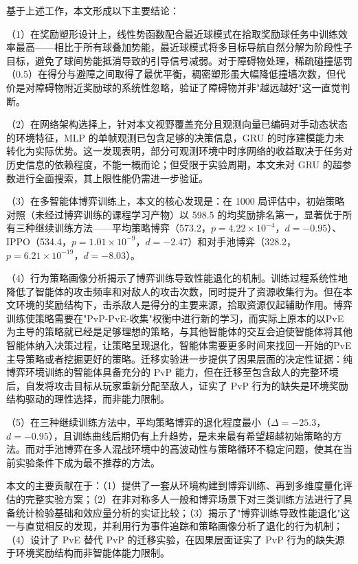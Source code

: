 \documentclass[12pt, a4paper, UTF8]{ctexart}
\numberwithin{equation}{section}
\begin{document}
基于上述工作，本文形成以下主要结论：

（1）在奖励塑形设计上，线性势函数配合最近球模式在拾取奖励球任务中训练效率最高——相比于所有球叠加势能，最近球模式将多目标导航自然分解为阶段性子目标，避免了球间势能抵消导致的引导信号减弱。对于障碍物处理，稀疏碰撞惩罚（0.5）在得分与避障之间取得了最优平衡，稠密塑形虽大幅降低撞墙次数，但代价是对障碍物附近奖励球的系统性忽略，验证了障碍物并非"越远越好"这一直觉判断。

（2）在网络架构选择上，针对本文视野覆盖充分且观测向量已编码对手动态状态的环境特征，MLP 的单帧观测已包含足够的决策信息，GRU 的时序建模能力未转化为实际优势。这一发现表明，部分可观测环境中时序网络的收益取决于任务对历史信息的依赖程度，不能一概而论；但受限于实验周期，本文未对 GRU 的超参数进行全面搜索，其上限性能仍需进一步验证。

（3）在多智能体博弈训练上，本文的核心发现是：在 1000 局评估中，初始策略对照（未经过博弈训练的课程学习产物）以 598.5 的均奖励排名第一，显著优于所有三种继续训练方法——平均策略博弈（573.2，$p=4.22\times10^{-4}$，$d=-0.95$）、IPPO（534.4，$p=1.01\times10^{-9}$，$d=-2.47$）和对手池博弈（328.2，$p=6.21\times10^{-19}$，$d=-8.03$）。

（4）行为策略画像分析揭示了博弈训练导致性能退化的机制。训练过程系统性地降低了智能体的攻击频率和对敌人的攻击次数，同时提升了资源收集行为。但在本文环境的奖励结构下，击杀敌人是得分的主要来源，拾取资源仅起辅助作用。博弈训练使策略需要在"PvP-PvE-收集"权衡中进行新的学习，而实际上原本的以PvE为主导的策略就已经是足够理想的策略，与其他智能体的交互会迫使智能体将其他智能体纳入决策过程，让策略呈现退化，智能体需要更多时间来找回一开始的PvE主导策略或者挖掘更好的策略。迁移实验进一步提供了因果层面的决定性证据：纯博弈环境训练的智能体具备充分的 PvP 能力，但在迁移至包含敌人的完整环境后，自发将攻击目标从玩家重新分配至敌人，证实了 PvP 行为的缺失是环境奖励结构驱动的理性选择，而非能力限制。

（5）在三种继续训练方法中，平均策略博弈的退化程度最小（$\Delta=-25.3$，$d=-0.95$），且训练曲线后期仍有上升趋势，是未来最有希望超越初始策略的方法。而对手池博弈在多人混战环境中的高波动性与策略循环不稳定问题，使其在当前实验条件下成为最不推荐的方法。

本文的主要贡献在于：（1）提供了一套从环境构建到博弈训练、再到多维度量化评估的完整实验方案；（2）在非对称多人一般和博弈场景下对三类训练方法进行了具备统计检验基础和效应量分析的实证比较；（3）揭示了"博弈训练导致性能退化"这一与直觉相反的发现，并利用行为事件追踪和策略画像分析了退化的行为机制；（4）设计了 PvE 替代 PvP 的迁移实验，在因果层面证实了 PvP 行为的缺失源于环境奖励结构而非智能体能力限制。
\end{document}

